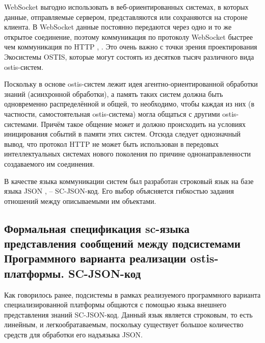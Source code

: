 \begin{textitemize}
    \item WebSocket выгодно использовать в веб-ориентированных системах, в которых данные, отправляемые сервером, представляются или сохраняются на стороне клиента. В WebSocket данные постоянно передаются через одно и то же открытое соединение, поэтому коммуникация по протоколу WebSocket быстрее чем коммуникация по HTTP , \cite{webockets_overview}. Это очень важно с точки зрения проектирования Экосистемы OSTIS, которые могут состоять из десятков тысяч различного вида ostis-систем.
    \item Поскольку в основе ostis-систем лежит идея агентно-ориентированной обработки знаний (асинхронной обработки), а память таких систем должна быть одновременно распределённой и общей, то необходимо, чтобы каждая из них (в частности, самостоятельная ostis-система) могла общаться с другими ostis-системами. Причём такое общение может и должно происходить на условиях иницирования событий в памяти этих систем. Отсюда следует однозначный вывод, что протокол HTTP не может быть использован в передовых интеллектуальных системах нового поколения по причине однонаправленности создаваемого им соединения.
\end{textitemize}
В качестве языка коммуникации систем был разработан строковый язык на базе языка JSON \cite{pezoa2016foundations},  -- SC-JSON-код. Его выбор объясняется гибкостью задания отношений между описываемыми им объектами.

\subsection{Формальная спецификация sc-языка представления сообщений между подсистемами Программного варианта реализации ostis-платформы. SC-JSON-код}
\label{sec_soft_platform_sc_json_code}

Как говорилось ранее, подсистемы в рамках реализуемого программного варианта специализированной платформы общаются с помощью языка внешнего представления знаний SC-JSON-код. Данный язык является строковым, то есть линейным, и легкообратаваемым, поскольку существует большое количество средств для обработки его надъязыка JSON.

\begin{SCn}
\begin{scnindent}
\end{scnindent}
\end{SCn}

